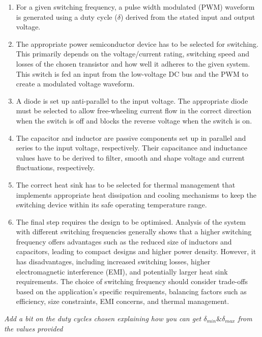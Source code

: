         \begin{enumerate}
            \item For a given switching frequency, a pulse width modulated (PWM) waveform is generated using a duty cycle (\(\delta\)) derived from the stated input and output voltage. 
            
            \item The appropriate power semiconductor device has to be selected for switching. This primarily depends on the voltage/current rating, switching speed and losses of the chosen transistor and how well it adheres to the given system. This switch is fed an input from the low-voltage DC bus and the PWM to create a modulated voltage waveform.

            \item A diode is set up anti-parallel to the input voltage. The appropriate diode must be selected to allow free-wheeling current flow in the correct direction when the switch is off and blocks the reverse voltage when the switch is on.

            \item The capacitor and inductor are passive components set up in parallel and series to the input voltage, respectively. Their capacitance and inductance values have to be derived to filter, smooth and shape voltage and current fluctuations, respectively.

            \item The correct heat sink has to be selected for thermal management that implements appropriate heat dissipation and cooling mechanisms to keep the switching device within its safe operating temperature range. 

            \item The final step requires the design to be optimised. Analysis of the system with different switching frequencies generally shows that a higher switching frequency offers advantages such as the reduced size of inductors and capacitors, leading to compact designs and higher power density. However, it has disadvantages, including increased switching losses, higher electromagnetic interference (EMI), and potentially larger heat sink requirements. The choice of switching frequency should consider trade-offs based on the application's specific requirements, balancing factors such as efficiency, size constraints, EMI concerns, and thermal management.
        \end{enumerate}

        \textit{Add a bit on the duty cycles chosen explaining how you can get \(\delta_{min} \& \delta_{max}\) from the values provided}


